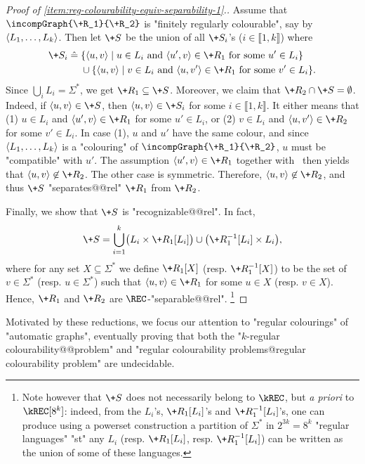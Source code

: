 \begin{proof}[Proof of \eqref{item:reg-colourability-equiv-separability-1}.]
    Assume that $\incompGraph{\+R_1}{\+R_2}$ is "finitely regularly colourable", say by
    $\langle L_1,\hdots,L_k\rangle$. Then let $\+S$ be the union of all $\+S_i$'s ($i \in \lBrack 1,k\rBrack$) where
    \begin{align*}
        \+S_i \defeq\; & \{\tup{u,v} \mid u \in L_i \text{ and } \tup{u',v} \in \+R_1 \text{ for some } u' \in L_i \}\\
        & \cup \{\tup{u,v} \mid v \in L_i \text{ and } \tup{u,v'} \in \+R_1 \text{ for some } v' \in L_i \}.  
    \end{align*}
    Since $\bigcup_i L_i = \Sigma^*$, we get $\+R_1 \subseteq \+S$.
    Moreover, we claim that $\+R_2 \cap \+S = \emptyset$. Indeed, if $\tup{u,v} \in \+S$,
    then $\tup{u,v} \in \+S_i$ for some $i \in \lBrack 1,k\rBrack$. It either means that
    (1) $u\in L_i$ and $\tup{u',v} \in \+R_1$ for some $u' \in L_i$, or
    (2) $v\in L_i$ and $\tup{u,v'} \in \+R_2$
    for some $v' \in L_i$. In case (1), $u$ and $u'$
    have the same colour, and since $\langle L_1,\hdots,L_k\rangle$ is a "colouring"
    of $\incompGraph{\+R_1}{\+R_2}$, $u$ must be "compatible" with $u'$.
    The assumption $\tup{u',v} \in \+R_1$ together with \compLpr\ then yields
    that $\tup{u,v} \not\in \+R_2$. The other case is symmetric.
    Therefore, $\tup{u,v} \not\in \+R_2$, and thus $\+S$ "separates@@rel" $\+R_1$ from $\+R_2$.

    Finally, we show that $\+S$ is "recognizable@@rel". In fact, 
    \[
        \+S = \bigcup_{i=1}^k \bigl(
            L_i \times \+R_1[L_i]
        \bigr) \cup \bigl(
            \+R_1^{-1}[L_i] \times L_i
        \bigr),
    \] 
    where for any set $X \subseteq \Sigma^*$ we define $\+R_1[X]$ (resp. $\+R_1^{-1}[X]$)
    to be the set of $v\in \Sigma^*$ (resp. $u \in \Sigma^*$) such that
    $\tup{u,v} \in \+R_1$ for some $u \in X$ (resp. $v\in X$).
    Hence, $\+R_1$ and $\+R_2$ are $\REC$-"separable@@rel".%
    \footnote{%
        Note however that $\+S$ does not necessarily belong to $\kREC$,
        but \emph{a priori} to $\kREC[8^k]$: indeed, from the
        $L_i$'s, $\+R_1[L_i]$'s and $\+R_1^{-1}[L_i]$'s,
        one can produce using a powerset construction a partition of $\Sigma^*$
        in $2^{3k} = 8^k$ "regular languages" "st" any $L_i$ (resp. $\+R_1[L_i]$,
        resp. $\+R_1^{-1}[L_i]$) can be written as the union of some of these languages.
    }
\end{proof}

Motivated by these reductions, we focus our attention to "regular colourings" of "automatic graphs",
eventually proving that both the "$k$-regular colourability@@problem" and
"regular colourability problems@regular colourability problem" are undecidable.
